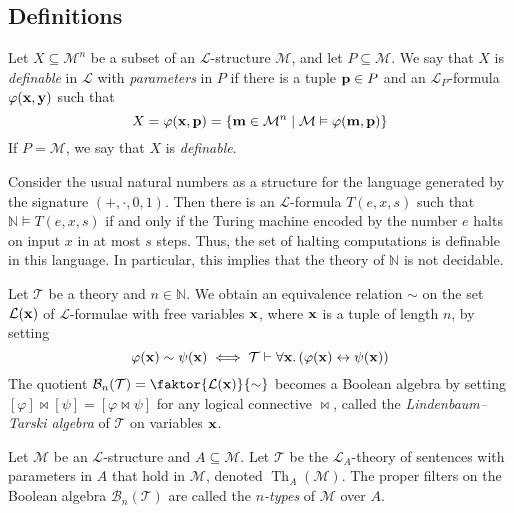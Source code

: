\subsection{Definitions}
\begin{definition}
    Let \( X \subseteq \mathcal M^n \) be a subset of an \( \mathcal L \)-structure \( \mathcal M \), and let \( P \subseteq \mathcal M \).
    We say that \( X \) is \emph{definable} in \( \mathcal L \) with \emph{parameters} in \( P \) if there is a tuple \( \vb p \in P \) and an \( \mathcal L_P \)-formula \( \varphi(\vb x, \vb y) \) such that
    \[ X = \varphi(\vb x, \vb p) = \qty{\vb m \in \mathcal M^n \mid \mathcal M \vDash \varphi(\vb m, \vb p)} \]
    If \( P = \mathcal M \), we say that \( X \) is \emph{definable}.
\end{definition}
\begin{example}
    Consider the usual natural numbers as a structure for the language generated by the signature \( (+, \cdot, 0, 1) \).
    Then there is an \( \mathcal L \)-formula \( T(e, x, s) \) such that \( \mathbb N \vDash T(e, x, s) \) if and only if the Turing machine encoded by the number \( e \) halts on input \( x \) in at most \( s \) steps.
    Thus, the set of halting computations is definable in this language.
    In particular, this implies that the theory of \( \mathbb N \) is not decidable.
\end{example}
\begin{definition}
    Let \( \mathcal T \) be a theory and \( n \in \mathbb N \).
    We obtain an equivalence relation \( \sim \) on the set \( \mathcal L(\vb x) \) of \( \mathcal L \)-formulae with free variables \( \vb x \), where \( \vb x \) is a tuple of length \( n \), by setting
    \[ \varphi(\vb x) \sim \psi(\vb x) \iff \mathcal T \vdash \forall \vb x.\, (\varphi(\vb x) \leftrightarrow \psi(\vb x)) \]
    The quotient \( \mathcal B_n(\mathcal T) = \faktor{\mathcal L(\vb x)}{\sim} \) becomes a Boolean algebra by setting \( [\varphi] \bowtie [\psi] = [\varphi \bowtie \psi] \) for any logical connective \( \bowtie \), called the \emph{Lindenbaum--Tarski algebra} of \( \mathcal T \) on variables \( \vb x \).
\end{definition}
\begin{definition}
    Let \( \mathcal M \) be an \( \mathcal L \)-structure and \( A \subseteq \mathcal M \).
    Let \( \mathcal T \) be the \( \mathcal L_A \)-theory of sentences with parameters in \( A \) that hold in \( \mathcal M \), denoted \( \operatorname{Th}_A(\mathcal M) \).
    The proper filters on the Boolean algebra \( \mathcal B_n(\mathcal T) \) are called the \emph{\( n \)-types} of \( \mathcal M \) over \( A \).
\end{definition}
